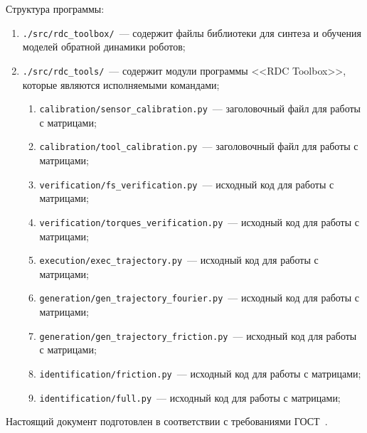 Структура программы:
\begin{enumerate}
    \item \verb|./src/rdc_toolbox/|~--- содержит файлы библиотеки для синтеза и обучения моделей обратной динамики роботов;
    \item \verb|./src/rdc_tools/|~--- содержит модули программы <<RDC Toolbox>>, которые являются исполняемыми командами;
    \begin{enumerate}
        \item \verb|calibration/sensor_calibration.py|~--- заголовочный файл для работы с матрицами;
        \item \verb|calibration/tool_calibration.py|~--- заголовочный файл для работы с матрицами;

        \item \verb|verification/fs_verification.py|~--- исходный код для работы с матрицами;
        \item \verb|verification/torques_verification.py|~--- исходный код для работы с матрицами;
        
        \item \verb|execution/exec_trajectory.py|~--- исходный код для работы с матрицами;
        
        \item \verb|generation/gen_trajectory_fourier.py|~--- исходный код для работы с матрицами;
        \item \verb|generation/gen_trajectory_friction.py|~--- исходный код для работы с матрицами;

        \item \verb|identification/friction.py|~--- исходный код для работы с матрицами;
        \item \verb|identification/full.py|~--- исходный код для работы с матрицами;
    \end{enumerate}
\end{enumerate}


Настоящий документ подготовлен в соответствии с требованиями ГОСТ~\cite{gost19106}.
